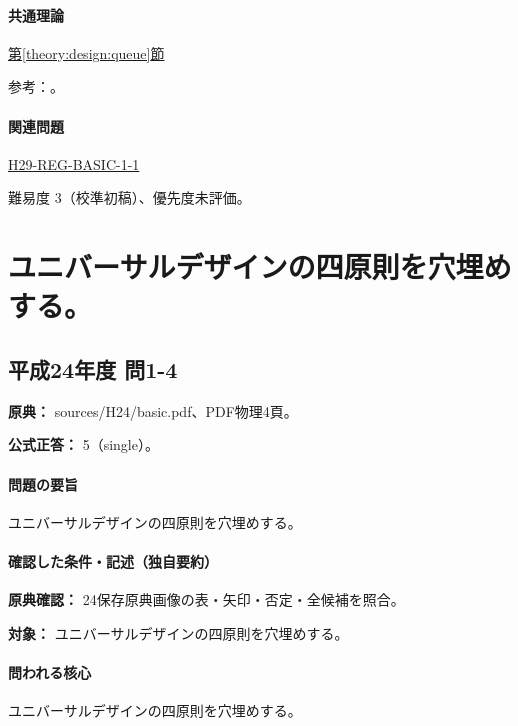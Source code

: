 \paragraph{共通理論} \hyperref[theory:design:queue]{第\ref*{theory:design:queue}節}

\par 参考：\cite{design48_queue_ref}。

\paragraph{関連問題} \hyperref[q:h29-reg-basic-1-1]{H29-REG-BASIC-1-1}

\par 難易度 3（校準初稿）、優先度未評価。

\section{ユニバーサルデザインの四原則を穴埋めする。}

\subsection{平成24年度 問1-4}
\label{q:h24-reg-basic-1-4}

\noindent\textbf{原典：} sources/H24/basic.pdf、PDF物理4頁。

\textbf{公式正答：} 5（single）。

\paragraph{問題の要旨} ユニバーサルデザインの四原則を穴埋めする。

\paragraph{確認した条件・記述（独自要約）}\mbox{}\par

\noindent\textbf{原典確認：} 24保存原典画像の表・矢印・否定・全候補を照合。\par

\noindent\textbf{対象：} ユニバーサルデザインの四原則を穴埋めする。\par

\paragraph{問われる核心} ユニバーサルデザインの四原則を穴埋めする。

